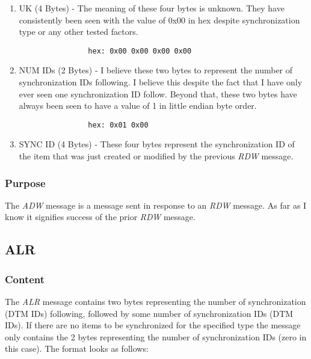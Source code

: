             \begin{enumerate}
            \item UK (4 Bytes) - The meaning of these four bytes is
              unknown. They have consistently been seen with the value of 0x00
              in hex despite synchronization type or any other tested factors.
              \begin{verbatim}
                hex: 0x00 0x00 0x00 0x00
              \end{verbatim}

            \item NUM IDs (2 Bytes) - I believe these two bytes to represent
              the number of synchronization IDs following. I believe this
              despite the fact that I have only ever seen one synchronization
              ID follow. Beyond that, these two bytes have always been seen to
              have a value of 1 in little endian byte order.
              \begin{verbatim}
                hex: 0x01 0x00
              \end{verbatim}

            \item SYNC ID (4 Bytes) - These four bytes represent the
              synchronization ID of the item that was just created or modified
              by the previous \emph{RDW} message.
            \end{enumerate}
            
            \subsubsection{Purpose}

            The \emph{ADW} message is a message sent in response to an
            \emph{RDW} message. As far as I know it signifies success of the
            prior \emph{RDW} message.

        \subsection{ALR}

            \subsubsection{Content}
            
            The \emph{ALR} message contains two bytes representing the number
            of synchronization (DTM IDs) following, followed by some number of
            synchronization IDs (DTM IDs). If there are no items to be
            synchronized for the specified type the message only contains
            the 2 bytes representing the number of synchronization IDs
            (zero in this case). The format looks as follows:


